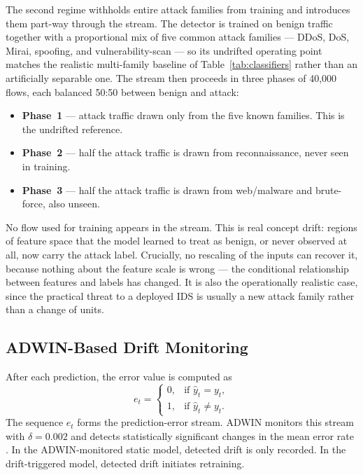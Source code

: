 \documentclass[11pt,a4paper]{article}
\begin{document}
The second regime withholds entire attack families from training and introduces
them part-way through the stream. The detector is trained on benign traffic
together with a proportional mix of five common attack families --- DDoS, DoS,
Mirai, spoofing, and vulnerability-scan --- so its undrifted operating point
matches the realistic multi-family baseline of Table~\ref{tab:classifiers}
rather than an artificially separable one. The stream then proceeds in three
phases of 40{,}000 flows, each balanced 50:50 between benign and attack:

\begin{itemize}
  \item \textbf{Phase~1} --- attack traffic drawn only from the five known
        families. This is the undrifted reference.
  \item \textbf{Phase~2} --- half the attack traffic is drawn from
        reconnaissance, never seen in training.
  \item \textbf{Phase~3} --- half the attack traffic is drawn from
        web/malware and brute-force, also unseen.
\end{itemize}

No flow used for training appears in the stream. This is real concept drift:
regions of feature space that the model learned to treat as benign, or never
observed at all, now carry the attack label. Crucially, no rescaling of the
inputs can recover it, because nothing about the feature scale is wrong --- the
conditional relationship between features and labels has changed. It is also the
operationally realistic case, since the practical threat to a deployed IDS is
usually a new attack family rather than a change of units.

\subsection{ADWIN-Based Drift Monitoring}
\label{sec:drift}

After each prediction, the error value is computed as
%
\begin{equation}
e_t =
\begin{cases}
0, & \text{if } \hat{y}_t = y_t,\\
1, & \text{if } \hat{y}_t \neq y_t.
\end{cases}
\end{equation}
%
The sequence $e_t$ forms the prediction-error stream. ADWIN monitors this
stream with $\delta = 0.002$ and detects statistically significant
changes in the mean error rate \cite{bifet2007}. In the
ADWIN-monitored static model, detected drift is only recorded. In the
drift-triggered model, detected drift initiates retraining.
\end{document}
